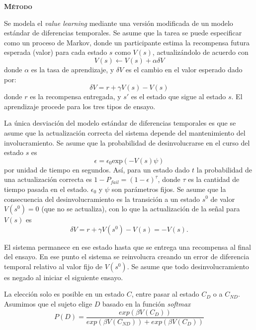\documentclass[a4paper,12pt]{article}
\begin{document}
{\scshape\bfseries Método}

Se modela el {\itshape value learning} mediante una versión modificada de un modelo estándar de diferencias temporales. Se asume que la tarea se puede especificar como un proceso de Markov, donde un participante estima la recompensa futura esperada (valor) para cada estado $s$ como $V(s)$, actualizándolo de acuerdo con
\begin{equation}
V(s)
\leftarrow
V(s) + \alpha \delta V
\end{equation}
donde $\alpha$ es la tasa de aprendizaje, y $\delta V$ es el cambio en el valor esperado dado por:
\begin{equation}
\delta V
=
r + \gamma V(s) - V(s)
\end{equation}
donde $r$ es la recompensa entregada, y $s'$ es el estado que sigue al estado $s$. El aprendizaje procede para los tres tipos de ensayo.

La única desviación del modelo estándar de diferencias temporales es que se asume que la actualización correcta del sistema depende del mantenimiento del involucramiento. Se asume que la probabilidad de desinvolucrarse en el curso del estado $s$ es
\begin{equation}
	\epsilon
	=
	\epsilon_{0}\mbox{exp}(-V(s)\psi)
\end{equation}
por unidad de tiempo en segundos. Así, para un estado dado $t$ la probabilidad de una actualización correcta es $1-P_{fail} = (1 - \epsilon)^{\tau}$, donde $\tau$ es la cantidad de tiempo pasada en el estado. $\epsilon_{0}$ y $\psi$ son parámetros fijos. Se asume que la consecuencia del desinvolucramiento es la transición a un estado $s^{0}$ de valor $V(s^{0}) = 0$ (que no se actualiza), con lo que la actualización de la señal para $V(s)$ es
\begin{equation}
	\delta V
	=
	r + \gamma V(s^{0}) - V(s)
	=
	-V(s).
\end{equation}

El sistema permanece en ese estado hasta que se entrega una recompensa al final del ensayo. En ese punto el sistema se reinvolucra creando un error de diferencia temporal relativo al valor fijo de $V(s^{0})$. Se asume que todo desinvolucramiento es negado al iniciar el siguiente ensayo.

La elección solo es posible en un estado $C$, entre pasar al estado $C_{D}$ o a $C_{ND}$. Asumimos que el sujeto elige $D$ basado en la función {\itshape softmax}
\begin{equation}
	P(D)
	=
	\frac{
		exp(\beta V(C_{D}))
	}{
	exp(\beta V(C_{ND})) + exp(\beta V (C_{D}))
	}
\end{equation}
\end{document}
